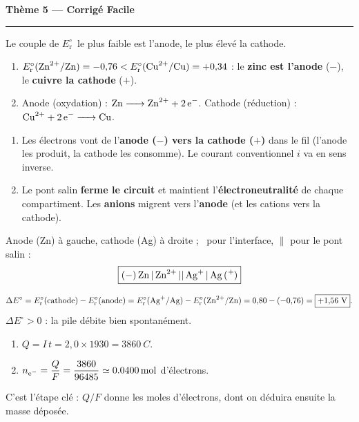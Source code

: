 \documentclass[11pt,a4paper]{article}
\newcommand{\Ered}{\ensuremath{E_{\mathrm{r}}^{\circ}}}
\newcommand{\fem}{\ensuremath{\Delta E}}
\begin{document}
\begin{center}
{\LARGE\bfseries\color{primarydark}Thème 5 — Corrigé Facile}\\[-2pt]
{\color{corrcol}\rule{\textwidth}{1pt}}
\end{center}

\begin{corr}
Le couple de \Ered\ le plus faible est l'anode, le plus élevé la cathode.
\begin{enumerate}[label=(\alph*),leftmargin=2em,topsep=1pt,itemsep=1.5pt]
  \item $\Ered(\ce{Zn^{2+}}/\ce{Zn})=-0{,}76 < \Ered(\ce{Cu^{2+}}/\ce{Cu})=+0{,}34$ : le \textbf{zinc est
        l'anode} ($-$), le \textbf{cuivre la cathode} ($+$).
  \item Anode (oxydation) : $\ce{Zn -> Zn^{2+} + 2 e^-}$. Cathode (réduction) : $\ce{Cu^{2+} + 2 e^- -> Cu}$.
\end{enumerate}
\end{corr}

\begin{corr}
\begin{enumerate}[label=(\alph*),leftmargin=2em,topsep=1pt,itemsep=1.5pt]
  \item Les électrons vont de l'\textbf{anode ($-$) vers la cathode ($+$)} dans le fil (l'anode les
        produit, la cathode les consomme). Le courant conventionnel $i$ va en sens inverse.
  \item Le pont salin \textbf{ferme le circuit} et maintient l'\textbf{électroneutralité} de chaque
        compartiment. Les \textbf{anions} migrent vers l'\textbf{anode} (et les cations vers la cathode).
\end{enumerate}
\end{corr}

\begin{corr}
Anode (Zn) à gauche, cathode (Ag) à droite ; \textbar\ pour l'interface, $\|$ pour le pont salin :
\[
\boxed{\ce{(-) Zn | Zn^{2+} || Ag+ | Ag (+)}}
\]
\end{corr}

\begin{corr}
\[
\fem^{\circ} = \Ered(\text{cathode}) - \Ered(\text{anode}) = \Ered(\ce{Ag+}/\ce{Ag}) - \Ered(\ce{Zn^{2+}}/\ce{Zn})
= 0{,}80 - (-0{,}76) = \boxed{+1{,}56\ \mathrm{V}}.
\]
$\fem^{\circ}>0$ : la pile débite bien spontanément.
\end{corr}

\begin{corr}
\begin{enumerate}[label=(\alph*),leftmargin=2em,topsep=1pt,itemsep=1.5pt]
  \item $Q = I\,t = 2{,}0 \times 1930 = \SI{3860}{C}$.
  \item $n_{\ce{e^-}} = \dfrac{Q}{F} = \dfrac{3860}{96485} \simeq \SI{0.0400}{mol}$ d'électrons.
\end{enumerate}
C'est l'étape clé : $Q/F$ donne les moles d'électrons, dont on déduira ensuite la masse déposée.
\end{corr}
\end{document}
